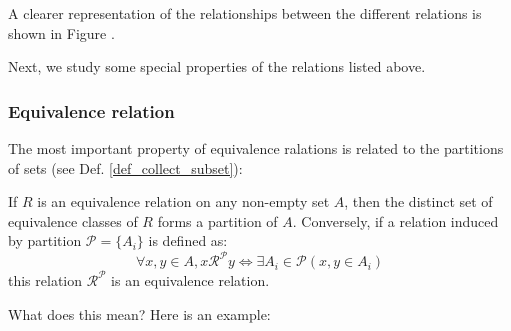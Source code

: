 A clearer representation of the relationships between the different relations is shown in Figure .

Next, we study some special properties of the relations listed above.

\subsubsection*{Equivalence relation}
The most important property of equivalence ralations is related to the partitions of sets (see Def. \ref{def_collect_subset}):
\begin{theorem}
    If $R$ is an equivalence relation on any non-empty set $A$, then the distinct set of equivalence classes of $R$ forms a partition of $A$.
    Conversely, if a relation induced by partition $\mathcal{P}=\{A_i\}$ is defined as:
    $$
    \forall x,y\in A, x\mathcal{R}^{\mathcal{P}}y \Leftrightarrow \exists A_i \in \mathcal{P}(x,y\in A_i)
    $$
    this relation $\mathcal{R}^{\mathcal{P}}$ is an equivalence relation.
\end{theorem}

What does this mean? Here is an example:
